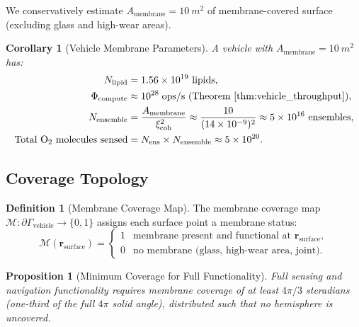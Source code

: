 \documentclass[12pt]{article}
\newtheorem{proposition}[theorem]{Proposition}
\newtheorem{corollary}[theorem]{Corollary}
\theoremstyle{definition}
\newtheorem{definition}[theorem]{Definition}
\theoremstyle{remark}
\newcommand{\xicoh}{\xi_{\mathrm{coh}}}
\newcommand{\Nens}{N_{\mathrm{ens}}}
\begin{document}
We conservatively estimate $A_{\mathrm{membrane}} = \SI{10}{m^2}$ of membrane-covered surface (excluding glass and high-wear areas).

\begin{corollary}[Vehicle Membrane Parameters]
\label{cor:vehicle_params}
A vehicle with $A_{\mathrm{membrane}} = \SI{10}{m^2}$ has:
\begin{align}
  N_{\mathrm{lipid}} &= 1.56 \times 10^{19} \text{ lipids}, \label{eq:vehicle_lipids} \\
  \Phi_{\mathrm{compute}} &\approx 10^{28}\;\text{ops/s (Theorem~\ref{thm:vehicle_throughput})}, \label{eq:vehicle_compute} \\
  N_{\mathrm{ensemble}} &= \frac{A_{\mathrm{membrane}}}{\xicoh^2} \approx \frac{10}{(14 \times 10^{-9})^2} \approx 5 \times 10^{16} \text{ ensembles}, \label{eq:vehicle_ensembles} \\
  \text{Total }  \mathrm{O}_2 \text{ molecules sensed} &= \Nens \times N_{\mathrm{ensemble}} \approx 5 \times 10^{20}. \label{eq:vehicle_o2}
\end{align}
\end{corollary}

\subsection{Coverage Topology}

\begin{definition}[Membrane Coverage Map]
\label{def:coverage}
The membrane coverage map $\mathcal{M}: \partial\Gamma_{\mathrm{vehicle}} \to \{0, 1\}$ assigns each surface point a membrane status:
\begin{equation}
  \mathcal{M}(\mathbf{r}_{\mathrm{surface}}) =
  \begin{cases}
    1 & \text{membrane present and functional at } \mathbf{r}_{\mathrm{surface}}, \\
    0 & \text{no membrane (glass, high-wear area, joint)}.
  \end{cases}
  \label{eq:coverage}
\end{equation}
\end{definition}

\begin{proposition}[Minimum Coverage for Full Functionality]
\label{prop:min_coverage}
Full sensing and navigation functionality requires membrane coverage of at least $4\pi/3$ steradians (one-third of the full $4\pi$ solid angle), distributed such that no hemisphere is uncovered.
\end{proposition}
\end{document}
